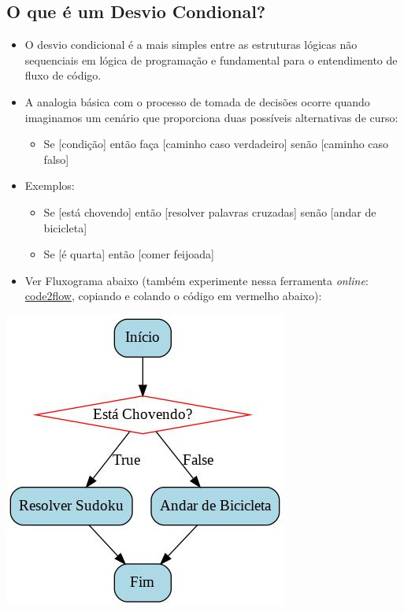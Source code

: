 \documentclass[12pt,a4paper]{article}
\providecommand{\tightlist}{%
      \setlength{\itemsep}{0pt}\setlength{\parskip}{0pt}}
\begin{document}
    \hypertarget{o-que-uxe9-um-desvio-condional}{%
\subsection{O que é um Desvio
Condional?}\label{o-que-uxe9-um-desvio-condional}}

    \begin{itemize}
\item
  O desvio condicional é a mais simples entre as estruturas lógicas não
  sequenciais em lógica de programação e fundamental para o entendimento
  de fluxo de código.
\item
  A analogia básica com o processo de tomada de decisões ocorre quando
  imaginamos um cenário que proporciona duas possíveis alternativas de
  curso:

  \begin{itemize}
  \tightlist
  \item
    Se {[}condição{]} então faça {[}caminho caso verdadeiro{]} senão
    {[}caminho caso falso{]}
  \end{itemize}
\item
  Exemplos:

  \begin{itemize}
  \tightlist
  \item
    Se {[}está chovendo{]} então {[}resolver palavras cruzadas{]} senão
    {[}andar de bicicleta{]}
  \item
    Se {[}é quarta{]} então {[}comer feijoada{]}
  \end{itemize}
\item
  Ver Fluxograma abaixo (também experimente nessa ferramenta
  \emph{online}: \href{https://app.code2flow.com/}{code2flow}, copiando
  e colando o código em vermelho abaixo):
\end{itemize}

\includegraphics{"figs/flowchartCap3a.jpg"}
\end{document}
